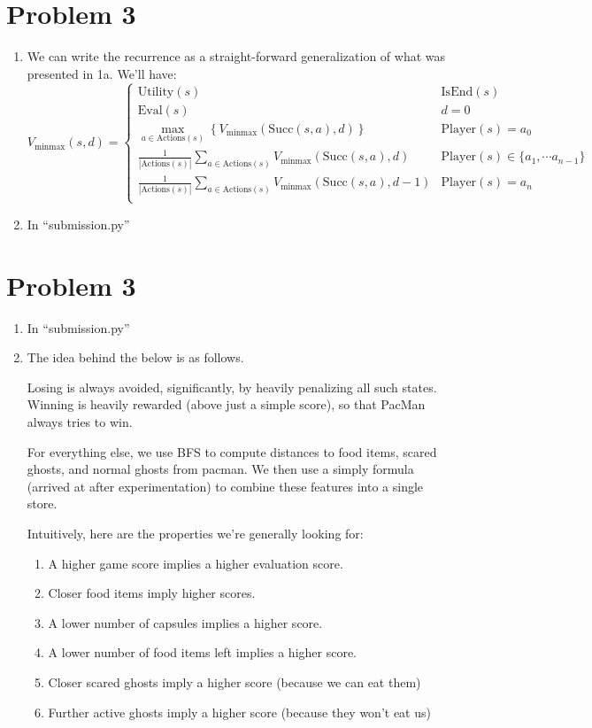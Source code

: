 \documentclass[12pt]{article}
\begin{document}
\section*{Problem 3}
\begin{enumerate}[label=(\alph*)]
  \item We can write the recurrence as a straight-forward generalization of what was presented in 1a. We'll have:
  $$
    V_{\text{minmax}}(s,d) =
      \begin{cases}
        \text{Utility}(s) & \text{IsEnd}(s) \\
        \text{Eval}(s) & d = 0 \\
        \max_{a \in \text{Actions}(s)} \left\{ V_{\text{minmax}}(\text{Succ}(s, a), d)\right\} & \text{Player}(s) = a_0 \\
        \frac{1}{|\text{Actions}(s)|}\sum_{a \in \text{Actions}(s)}  V_{\text{minmax}}(\text{Succ}(s, a), d) & \text{Player}(s) \in \{ a_1, \cdots a_{n-1}\} \\
        \frac{1}{|\text{Actions}(s)|}\sum_{a \in \text{Actions}(s)}  V_{\text{minmax}}(\text{Succ}(s, a), d - 1) & \text{Player}(s) = a_n \\
      \end{cases}
  $$
  \item In ``submission.py''
\end{enumerate}


\section*{Problem 3}
\begin{enumerate}[label=(\alph*)]
  \item In ``submission.py''
  \item The idea behind the below is as follows.

    Losing is always avoided, significantly, by heavily penalizing all such states.
    Winning is heavily rewarded (above just a simple score), so that PacMan always tries to win.

    For everything else, we use BFS to compute distances to food items, scared ghosts, and
    normal ghosts from pacman. We then use a simply formula (arrived at after experimentation)
    to combine these features into a single store.

    Intuitively, here are the properties we're generally looking for:
    \begin{enumerate}
      \item A higher game score implies a higher evaluation score.
      \item Closer food items imply higher scores.
      \item A lower number of capsules implies a higher score.
      \item A lower number of food items left implies a higher score.
      \item Closer scared ghosts imply a higher score (because we can eat them)
      \item Further active ghosts imply a higher score (because they won't eat us)
    \end{enumerate}
\end{enumerate}
\end{document}
